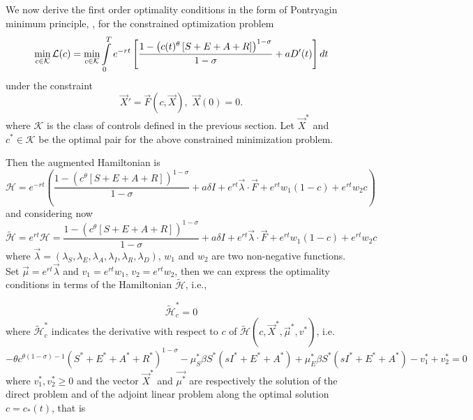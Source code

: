 \documentclass{amsart}
\begin{document}
We now derive the first order optimality conditions in the form of Pontryagin minimum principle, \cite{P}, for  the constrained optimization problem 
\begin{equation}\label{Min}
\min_{c\in\mathcal{K}}\mathcal{L}(c)=\min_{c\in\mathcal{K}} \intop_0^{T}e^{-rt}\left[
\frac{1-\left(c(t)^{\theta} \left[S+E+A+R\right]\right)^{1-\sigma}}{1-\sigma}
+aD'(t)\right]dt 
\end{equation}
under the constraint 
\begin{equation}\label{const}
\vec{X}'=\vec{F}(c,\Vec{X}),\,\,\vec{X}(0)=0.
\end{equation}
where $\mathcal{K}$ is the class of controls defined in the previous section.
Let $\Vec{X}^*$ and $c^*\in \mathcal{K}$ be the optimal pair for the above constrained minimization problem. 

Then the augmented Hamiltonian is
$$
\mathcal{H}=e^{-rt}\left(\frac{1-\left(c^{\theta} \left[S+E+A+R\right]\right)^{1-\sigma}}{1-\sigma}+a\delta I+e^{rt}\vec{\lambda}\cdot\vec{F}+e^{rt}w_1(1-c)+e^{rt}w_2c\right)
$$
and considering now
$$
\mathcal{\tilde H}=e^{rt}\mathcal{H}=\frac{1-\left(c^{\theta} \left[S+E+A+R\right]\right)^{1-\sigma}}{1-\sigma}+a\delta I+e^{rt}\vec{\lambda}\cdot\vec{F}+e^{rt}w_1(1-c)+e^{rt}w_2c
$$
where $\vec{\lambda}=(\lambda_S,\lambda_E,\lambda_A,\lambda_I,\lambda_R,\lambda_D)$, $w_1$ and $w_2$ are two non-negative functions. Set $\vec{\mu}=e^{rt}\vec{\lambda}$ and $v_1=e^{rt}w_1$, $v_2=e^{rt}w_2$, then we can express the optimality conditions in terms of the Hamiltonian $\mathcal{\tilde H}$, i.e.,  

$$
\mathcal{\tilde H}_c^*=0
$$
where $\mathcal{\tilde H}_c^*$ indicates the  derivative with respect to $c$ of $\mathcal{\tilde H}(c,\Vec{X}^*,\vec{\mu}^*,v^*)$, 
i.e. 
$$
-\theta c^{\theta(1-\sigma)-1}(S^*+E^*+A^*+R^*)^{1-\sigma}-\mu^*_S \beta S^*(sI^*+E^*+A^*)+\mu^*_E \beta S^*(sI^*+E^*+A^*)-v^*_1+v^*_2=0
$$
where $v^*_1,v^*_2\geq 0$ and the vector $\vec{X}^*$ and $\vec{\mu^*}$ are respectively the solution of the direct problem and of the adjoint linear problem along the optimal solution $c=c_*(t)$, that is
\end{document}
